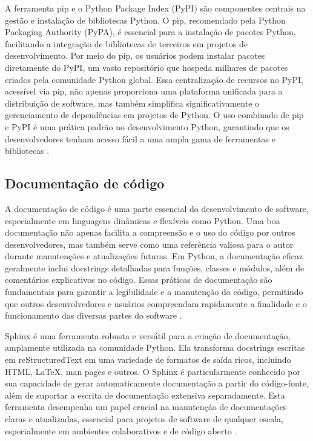 A ferramenta pip e o {Python} Package Index (PyPI) são componentes centrais na gestão e instalação de bibliotecas {Python}.
O pip, recomendado pela {Python} Packaging Authority (PyPA), é essencial para a instalação de pacotes {Python},
facilitando a integração de bibliotecas de terceiros em projetos de desenvolvimento.
Por meio do pip, os usuários podem instalar pacotes diretamente do PyPI, um vasto repositório que hospeda milhares de
pacotes criados pela comunidade {Python} global.
Essa centralização de recursos no PyPI, acessível via pip, não apenas proporciona uma plataforma unificada para a
distribuição de software, mas também simplifica significativamente o gerenciamento de dependências em projetos de
{Python}.
O uso combinado de pip e PyPI é uma prática padrão no desenvolvimento Python, garantindo que os desenvolvedores tenham
acesso fácil a uma ampla gama de ferramentas e bibliotecas \cite{pip}.

\subsection{Documentação de código}

A documentação de código é uma parte essencial do desenvolvimento de software, especialmente em linguagens dinâmicas e
flexíveis como Python.
Uma boa documentação não apenas facilita a compreensão e o uso do código por outros desenvolvedores, mas também serve
como uma referência valiosa para o autor durante manutenções e atualizações futuras.
Em Python, a documentação eficaz geralmente inclui docstrings detalhadas para funções, classes e módulos, além de
comentários explicativos no código.
Essas práticas de documentação são fundamentais para garantir a legibilidade e a manutenção do código, permitindo que
outros desenvolvedores e usuários compreendam rapidamente a finalidade e o funcionamento das diversas partes do software
\cite{pydocs}.

Sphinx é uma ferramenta robusta e versátil para a criação de documentação, amplamente utilizada na comunidade Python.
Ela transforma docstrings escritas em reStructuredText em uma variedade de formatos de saída ricos, incluindo HTML,
LaTeX, man pages e outros.
O Sphinx é particularmente conhecido por sua capacidade de gerar automaticamente documentação a partir do código-fonte,
além de suportar a escrita de documentação extensiva separadamente.
Esta ferramenta desempenha um papel crucial na manutenção de documentações claras e atualizadas, essencial para projetos
de software de qualquer escala, especialmente em ambientes colaborativos e de código aberto \cite{sphinx}.

